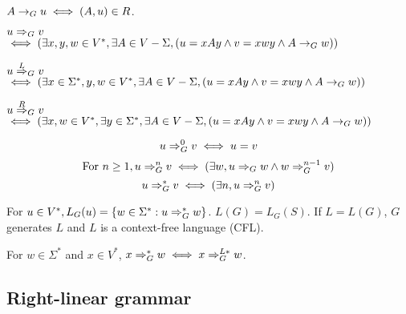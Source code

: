 \begin{definition}
$A \rightarrow_{G} u \iff (A, u) \in R$.
\end{definition}
\begin{definition}
$u \Rightarrow_{G} v$\\
$\iff (\exists x,y,w \in V^*, \exists A \in V - \Sigma,
(u = xAy \wedge v = xwy \wedge A \rightarrow_{G} w))$
\end{definition}
\begin{definition}
$u \overset{L}{\Rightarrow}_{G} v$\\
$\iff (\exists x \in \Sigma^*, y, w \in V^*, \exists A \in V - \Sigma,
(u = xAy \wedge v = xwy \wedge A \rightarrow_{G} w))$
\end{definition}
\begin{definition}
$u \overset{R}{\Rightarrow}_{G} v$\\
$\iff (\exists x, w \in V^*, \exists y \in \Sigma^*, \exists A \in V - \Sigma,
(u = xAy \wedge v = xwy \wedge A \rightarrow_{G} w))$
\end{definition}
\begin{definition}[$\gArrow{G}^n$]
\[ u \Rightarrow_{G}^0 v \iff u = v \]
\[ \textrm{For } n \ge 1, u \Rightarrow_{G}^n v \iff (\exists w, u \Rightarrow_{G} w \wedge w \Rightarrow_{G}^{n-1} v) \]
\[ u \Rightarrow_{G}^* v \iff (\exists n, u \Rightarrow_{G}^n v) \]
\end{definition}
\begin{definition}
For $u \in V^*, L_G(u) = \{w \in \Sigma^*: u \Rightarrow_{G}^* w \}$.
$L(G) = L_G(S)$.
If $L = L(G)$, $G$ generates $L$ and $L$ is a context-free language (CFL).
\end{definition}
\begin{theorem}
For $w \in \Sigma^*$ and $x \in V^*$, $x \Rightarrow_{G}^* w \iff x \Rightarrow _G^{L*} w$.
\end{theorem}

\subsection{Right-linear grammar}

